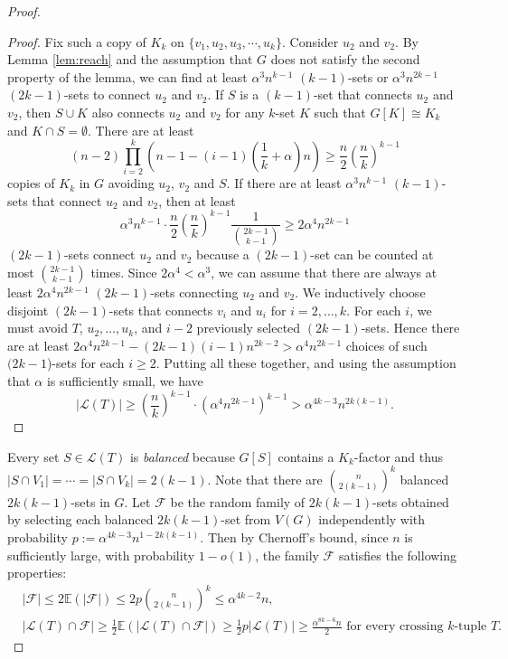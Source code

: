 \documentclass[reqno]{amsart}
\theoremstyle{plain}
\def\a{\alpha}
\begin{document}
\begin{proof}
\begin{proof}
Fix such a copy of $K_k$ on $\{v_1,u_2,u_3,\cdots,u_k\}$. Consider $u_2$ and $v_2$.
By Lemma \ref{lem:reach} and the assumption that $G$ does not satisfy the second property of the lemma, we can find at least $\alpha^3 n^{k-1}$ $(k-1)$-sets or $\alpha^3 n^{2k-1}$ $(2k-1)$-sets to connect $u_2$ and $v_2$. If $S$ is a $(k-1)$-set that connects $u_2$ and $v_2$, then $S\cup K$ also connects $u_2$ and $v_2$ for any $k$-set $K$ such that $G[K]\cong K_k$ and $K\cap S = \emptyset$. There are at least
\[
(n-2)\prod^k_{i=2}\left(n-1-(i-1)\left(\frac1k+\a \right)n\right)\ge \frac{n}{2} \left(\frac n k\right)^{k-1}
\]
copies of $K_k$ in $G$ avoiding $u_2$, $v_2$ and $S$. If there are at least $\alpha^3 n^{k-1}$ $(k-1)$-sets that connect $u_2$ and $v_2$, then at least
\[
\alpha^3 n^{k-1} \cdot \frac{n}{2} \left(\frac n k\right)^{k-1} \frac{1}{\binom{2k-1}{k-1}}\ge 2\alpha^4 n^{2k-1}
\]
$(2k-1)$-sets connect $u_2$ and $v_2$ because a $(2k-1)$-set can be counted at most $\binom{2k-1}{k-1}$ times. Since $2\a^4 < \a^3$, we can assume that there are always at least $2\alpha^4 n^{2k-1}$ $(2k-1)$-sets connecting $u_2$ and $v_2$. We inductively choose disjoint $(2k-1)$-sets that connects $v_i$ and $u_i$ for $i=2, \dots, k$. For each $i$, we must avoid $T$, $u_2, \dots, u_k$, and $i-2$ previously selected $(2k-1)$-sets. Hence there are at least $2\alpha^4 n^{2k-1}-(2k-1)(i-1)n^{2k-2}>\alpha^4 n^{2k-1}$ choices of such $(2k-1$)-sets for each $i\ge 2$. Putting all these together, and using the assumption that $\a$ is sufficiently small, we have
$$|\mathcal{L}(T)|\ge \left(\frac n k\right)^{k-1}\cdot (\alpha^4n^{2k-1})^{k-1}>\alpha^{4k-3}n^{2k(k-1)}.$$

\end{proof}

Every set $S\in \mathcal{L}(T)$ is \emph{balanced} because $G[S]$ contains a $K_k$-factor and thus $|S\cap V_1| = \cdots = |S\cap V_k|= 2(k-1)$. Note that there are $\binom{n}{2(k-1)}^k$ balanced $2k(k-1)$-sets in $G$. Let $\mathcal{F}$ be the random family of $2k(k-1)$-sets obtained by selecting each balanced $2k(k-1)$-set from $V(G)$ independently with probability $p:= \alpha^{4k-3}n^{1-2k(k-1)}$.
Then by Chernoff's bound, since $n$ is sufficiently large, with probability $1-o(1)$, the family $\mathcal{F}$ satisfies the following properties:
\begin{align}
&|\mathcal{F}|\le 2\mathbb{E}(|\mathcal{F}|)\le 2p\binom{n}{2(k-1)}^k\le \alpha^{4k-2}n, & \label {eq:1}\\
&|\mathcal{L}(T)\cap\mathcal{F}|\ge \frac{1}2\mathbb{E}(|\mathcal{L}(T)\cap\mathcal{F}|)\ge \frac{1}2p|\mathcal{L}(T)|\ge \frac{\alpha^{8k-6}n}2 \text{ for every crossing }k\text{-tuple }T.&\label {eq:2}
\end{align}


\end{proof}
\end{document}

